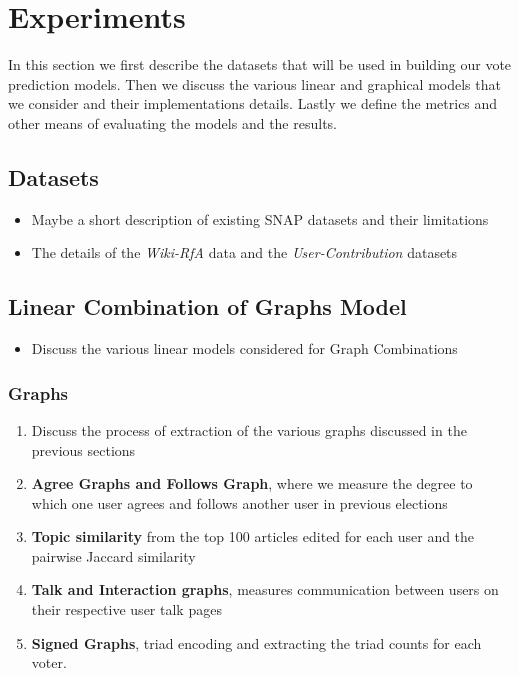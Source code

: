 \chapter{Experiments}
\label{chp:experiments}
In this section we first describe the datasets that will be used in building our vote prediction models. Then we discuss the various linear and graphical models that we consider and their implementations details. Lastly we define the metrics and other means of evaluating the models and the results.

\section{Datasets}
\begin{itemize}
    \item Maybe a short description of existing SNAP datasets and their limitations
    \item The details of the \textit{Wiki-RfA} data and the \textit{User-Contribution} datasets
\end{itemize}

\section{Linear Combination of Graphs Model}
\begin{itemize}
    \item Discuss the various linear models considered for Graph Combinations
\end{itemize}    
\subsection{Graphs}
    \begin{enumerate}
        \item Discuss the process of extraction of the various graphs discussed in the previous sections
        \item \textbf{Agree Graphs and Follows Graph}, where we measure the degree to which one user agrees and follows another user in previous elections
        \item \textbf{Topic similarity} from the top 100 articles edited for each user and the pairwise Jaccard similarity 
        \item \textbf{Talk and Interaction graphs}, measures communication between users on their respective user talk pages
        \item \textbf{Signed Graphs}, triad encoding and extracting the triad counts for each voter. 
\end{enumerate}
